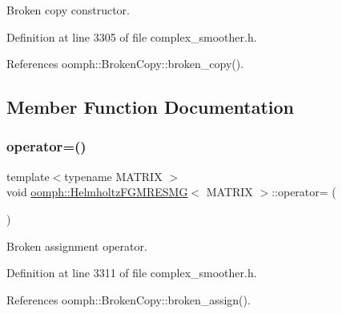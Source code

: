 Broken copy constructor. 



Definition at line 3305 of file complex\+\_\+smoother.\+h.



References oomph\+::\+Broken\+Copy\+::broken\+\_\+copy().



\subsection{Member Function Documentation}
\mbox{\label{classoomph_1_1HelmholtzFGMRESMG_a44c13f9627e5700eb9a14bdfc890fb22}} 
\subsubsection{\texorpdfstring{operator=()}{operator=()}}
{\footnotesize\ttfamily template$<$typename M\+A\+T\+R\+IX $>$ \\
void \hyperlink{classoomph_1_1HelmholtzFGMRESMG}{oomph\+::\+Helmholtz\+F\+G\+M\+R\+E\+S\+MG}$<$ M\+A\+T\+R\+IX $>$\+::operator= (\begin{DoxyParamCaption}\item[{const \hyperlink{classoomph_1_1HelmholtzFGMRESMG}{Helmholtz\+F\+G\+M\+R\+E\+S\+MG}$<$ M\+A\+T\+R\+IX $>$ \&}]{ }\end{DoxyParamCaption})\hspace{0.3cm}{\ttfamily [inline]}}



Broken assignment operator. 



Definition at line 3311 of file complex\+\_\+smoother.\+h.



References oomph\+::\+Broken\+Copy\+::broken\+\_\+assign().

\mbox{\label{classoomph_1_1HelmholtzFGMRESMG_ae3272923b5eb1bd6d7f494a8bafdf303}} 
